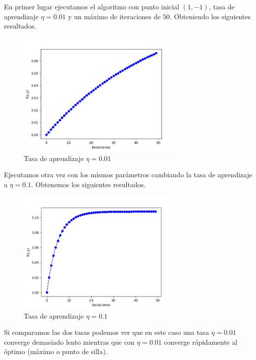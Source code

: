 \documentclass[size=a4, parskip=half, titlepage=false, toc=flat, toc=bib, 12pt]{scrartcl}
\begin{document}
En primer lugar ejecutamos el algoritmo con punto inicial $(1,-1)$, tasa de aprendizaje
$\eta = 0.01$ y un máximo de iteraciones de $50$. Obteniendo los siguientes resultados.

\begin{figure}[H]
\centering
\includegraphics[width=0.7\textwidth]{./img/bonus21}
\caption{Tasa de aprendizaje $\eta = 0.01$}
\end{figure}

Ejecutamos otra vez con los mismos parámetros cambiando la tasa de aprendizaje a $\eta = 0.1$.
Obtenemos los siguientes resultados.

\begin{figure}[H]
\centering
\includegraphics[width=0.7\textwidth]{./img/bonus22}
\caption{Tasa de aprendizaje $\eta = 0.1$}
\end{figure}

Si comparamos las dos tasas podemos ver que en este caso una tasa $\eta = 0.01$ converge demasiado
lento mientras que con $\eta = 0.01$ converge rápidamente al óptimo (máximo o punto de silla).
\end{document}
